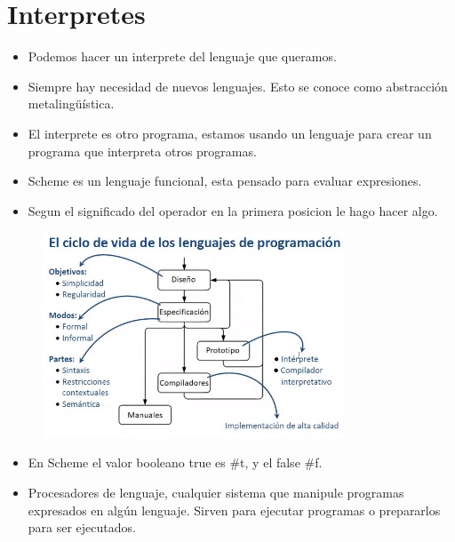 \section{Interpretes}


\begin{itemize}
\item Podemos hacer un interprete del lenguaje que queramos.
\item Siempre hay necesidad de nuevos lenguajes. Esto se conoce como abstracción metalingüística.
\item El interprete es otro programa, estamos usando un lenguaje para crear un programa que interpreta otros programas.
\item Scheme es un lenguaje funcional, esta pensado para evaluar expresiones.
\item Segun el significado del operador en la primera posicion le hago hacer algo.
\end{itemize}

\begin{figure}[!htb]
    \centering
    \includegraphics[width=0.8\textwidth]{img/CicloDeVidaLenguajes.jpg}
\end{figure}


\begin{itemize}
\item En Scheme el valor booleano true es \#t, y el false \#f.
\item Procesadores de lenguaje, cualquier sistema que manipule programas expresados en algún lenguaje. Sirven para ejecutar programas o prepararlos para ser ejecutados.
\end{itemize}

